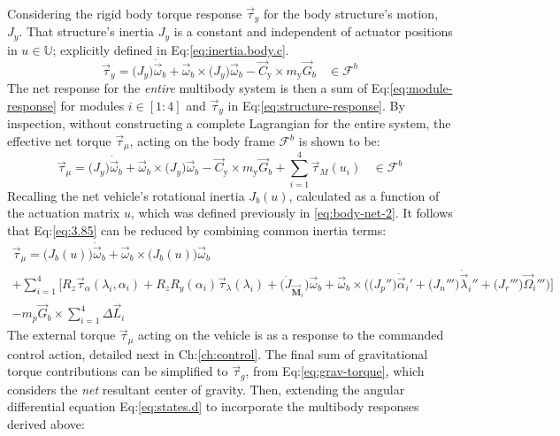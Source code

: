 Considering the rigid body torque response $\vec{\tau}_y$ for the body structure's motion, $J_y$. That structure's inertia $J_y$ is a constant and independent of actuator positions in $u\in\mathbb{U}$; explicitly defined in Eq:\ref{eq:inertia.body.c}.
\begin{equation}\label{eq:structure-response}
\vec{\tau}_y=\big(J_y\big)\dot{\vec{\omega}}_b+\vec{\omega}_b\times\big(J_y\big)\vec{\omega}_b-\vec{C}_\text{y}\times m_\text{y}\vec{G}_b~~~~\in\mathcal{F}^b
\end{equation}
The net response for the \emph{entire} multibody system is then a sum of Eq:\ref{eq:module-response} for modules $i\in[1:4]$ and $\vec{\tau}_y$ in Eq:\ref{eq:structure-response}. By inspection, without constructing a complete Lagrangian for the entire system, the effective net torque $\vec{\tau}_{\mu}$, acting on the body frame $\mathcal{F}^b$ is shown to be:
\begin{equation}\label{eq:3.85}
\vec{\tau}_\mu = \big(J_y\big)\dot{\vec{\omega}}_b+\vec{\omega}_b\times\big(J_y\big)\vec{\omega}_b-\vec{C}_\text{y}\times m_\text{y}\vec{G}_b+\sum_{i=1}^{4}\vec{\tau}_{M}(u_i)~~~~\in\mathcal{F}^b
\end{equation}
Recalling the net vehicle's rotational inertia $J_b(u)$, calculated as a function of the actuation matrix $u$, which was defined previously in \ref{eq:body-net-2}. It follows that Eq:\ref{eq:3.85} can be reduced by combining common inertia terms:
\begin{multline}\label{eq:3.109}
\vec{\tau}_\mu=\big(J_b(u)\big)\dot{\vec{\omega}}_b+\vec{\omega}_b\times\big(J_b(u)\big)\vec{\omega}_b
\\
+\sum_{i=1}^{4}\Big[R_z\vec{\tau}_\alpha(\lambda_i,\alpha_i)+R_zR_y(\alpha_i)\vec{\tau}_\lambda(\lambda_i)+\big(\dot{J}_{\vec{\mathbf{M}}_i}\big)\vec{\omega}_b+\vec{\omega}_b\times\Big(\big(J_p''\big)\dot{\vec{\alpha}}_i'+\big(J_n'''\big)\dot{\vec{\lambda}}_i''+\big(J_r'''\big)\vec{\Omega}_i'''\Big)\Big]
\\
-m_p\vec{G}_b\times\sum_{i=1}^{4}\Delta \vec{L}_i
\end{multline}
The external torque $\vec{\tau}_{\mu}$ acting on the vehicle is as a response to the commanded control action, detailed next in Ch:\ref{ch:control}. The final sum of gravitational torque contributions can be simplified to $\vec{\tau}_g$, from Eq:\ref{eq:grav-torque}, which considers the \emph{net} resultant center of gravity. Then, extending the angular differential equation Eq:\ref{eq:states.d} to incorporate the multibody responses derived above:
